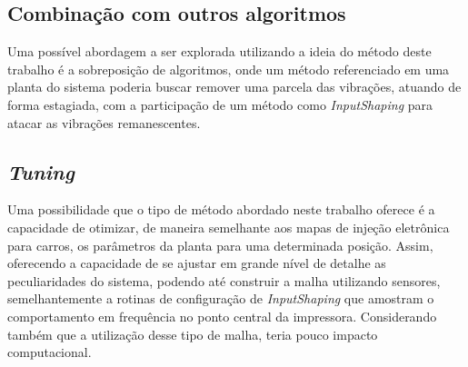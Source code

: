 \subsection{Combinação com outros algoritmos}
Uma possível abordagem a ser explorada utilizando a ideia do método deste trabalho é a sobreposição de algoritmos, onde
um método referenciado em uma planta do sistema poderia buscar remover uma parcela das vibrações, atuando de forma estagiada,
com a participação de um método como \textit{InputShaping} para atacar as vibrações remanescentes.

\subsection{\textit{Tuning}}
Uma possibilidade que o tipo de método abordado neste trabalho oferece é a capacidade de otimizar, de maneira
semelhante aos mapas de injeção eletrônica para carros, os parâmetros da planta para uma determinada posição.
Assim, oferecendo a capacidade de se ajustar em grande nível de detalhe as peculiaridades do sistema, podendo até
construir a malha utilizando sensores, semelhantemente a rotinas de configuração de \textit{InputShaping} que amostram
o comportamento em frequência no ponto central da impressora. Considerando também que a utilização desse tipo de malha,
teria pouco impacto computacional.


